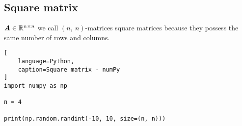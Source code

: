 \subsection{Square matrix}

$\text{\textbf{\textit{A}}} \in \mathbb{R}^{n\times n}$
we call $(n,\ n)$-matrices square matrices because they possess the same number of rows and columns.


\begin{lstlisting}[
    language=Python,
    caption=Square matrix - numPy
]
import numpy as np

n = 4

print(np.random.randint(-10, 10, size=(n, n)))
\end{lstlisting}


